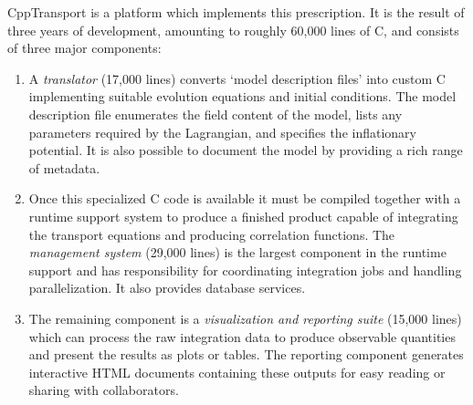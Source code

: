 \documentclass[11pt,a4paper]{article}
\newcommand{\packagefont}{\sffamily}
\newcommand{\CppTransport}{{\packagefont CppTransport}}
\newcommand\CC{C\nolinebreak\hspace{-.05em}\raisebox{.4ex}{\relsize{-3}{\textbf{+}}}\nolinebreak\hspace{-.10em}\raisebox{.4ex}{\relsize{-3}{\textbf{+}}}}
\begin{document}
{\CppTransport} is a platform which implements
this prescription.
It is the result of three years of development, amounting to roughly 60,000
lines of {\CC},
and consists of three major components:
\begin{enumerate}
    \item
    A \emph{translator} (17,000 lines)
    converts `model description files' into
    custom {\CC} implementing suitable evolution equations and
    initial conditions.
    The model description file enumerates the field content of the model,
    lists any parameters required by the Lagrangian, and
    specifies the inflationary potential.
    It is also possible to document the model by providing
    a rich range of metadata.
    
    \item
    Once this specialized {\CC} code is available it must be compiled
    together with a runtime support system to produce a finished product capable
    of integrating the transport equations and producing correlation
    functions.
    The \emph{management system} (29,000 lines) is the largest component
    in the runtime support
    and
    has responsibility for coordinating integration jobs
    and
    handling parallelization.
    It also provides database services.
    
    \item The remaining component is a \emph{visualization and reporting suite}
    (15,000 lines)
    which can process the raw integration data to produce observable
    quantities
    and present the results as plots or tables.
    The reporting component generates interactive HTML
    documents
    containing these outputs
    for easy reading or sharing with collaborators.
\end{enumerate}
\end{document}
